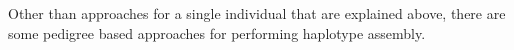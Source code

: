 % 
% 

Other than approaches for a single individual that are explained above, there are some pedigree based approaches for performing haplotype assembly.

